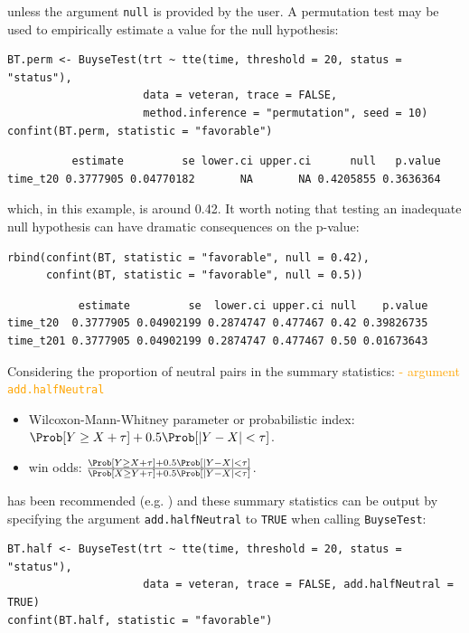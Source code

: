 \documentclass[12pt]{article}
\begin{document}
unless the argument \texttt{null} is provided by the user. A permutation test
may be used to empirically estimate a value for the null hypothesis:
\lstset{language=r,label= ,caption= ,captionpos=b,numbers=none}
\begin{lstlisting}
BT.perm <- BuyseTest(trt ~ tte(time, threshold = 20, status = "status"),
                     data = veteran, trace = FALSE,
                     method.inference = "permutation", seed = 10)
confint(BT.perm, statistic = "favorable")
\end{lstlisting}

\begin{verbatim}
          estimate         se lower.ci upper.ci      null   p.value
time_t20 0.3777905 0.04770182       NA       NA 0.4205855 0.3636364
\end{verbatim}


which, in this example, is around 0.42. It worth noting that testing
an inadequate null hypothesis can have dramatic consequences on the
p-value:
\lstset{language=r,label= ,caption= ,captionpos=b,numbers=none}
\begin{lstlisting}
rbind(confint(BT, statistic = "favorable", null = 0.42),
      confint(BT, statistic = "favorable", null = 0.5))
\end{lstlisting}

\begin{verbatim}
           estimate         se  lower.ci upper.ci null    p.value
time_t20  0.3777905 0.04902199 0.2874747 0.477467 0.42 0.39826735
time_t201 0.3777905 0.04902199 0.2874747 0.477467 0.50 0.01673643
\end{verbatim}


\clearpage

\noindent Considering the proportion of neutral pairs in the summary
statistics: \hfill \textcolor{orange}{- argument \texttt{add.halfNeutral}}
\begin{itemize}
\item Wilcoxon-Mann-Whitney parameter or probabilistic index: \(\Prob[Y\geq X + \tau] + 0.5 \Prob[|Y- X| < \tau]\).
\item win odds: \(\frac{\Prob[Y\geq X + \tau] + 0.5 \Prob[|Y- X| < \tau]}{\Prob[X\geq Y + \tau] + 0.5 \Prob[|Y- X| < \tau]}\).
\end{itemize}
has been recommended (e.g. \cite{ajufo2023fallacies}) and these summary
statistics can be output by specifying the argument \texttt{add.halfNeutral}
to \texttt{TRUE} when calling \texttt{BuyseTest}:
\lstset{language=r,label= ,caption= ,captionpos=b,numbers=none}
\begin{lstlisting}
BT.half <- BuyseTest(trt ~ tte(time, threshold = 20, status = "status"),
                     data = veteran, trace = FALSE, add.halfNeutral = TRUE)
confint(BT.half, statistic = "favorable")
\end{lstlisting}
\end{document}
